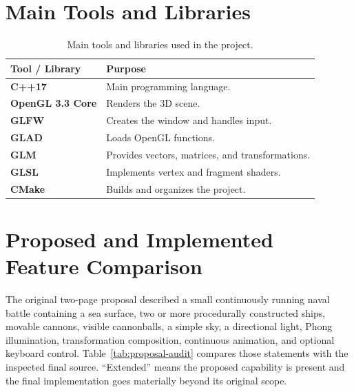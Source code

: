 \documentclass[12pt,a4paper]{report}
\begin{document}
\section{Main Tools and Libraries}
\begin{table}[H]
\centering
\caption{Main tools and libraries used in the project.}
\label{tab:tools}
\begin{tabularx}{0.92\textwidth}{>{\bfseries}p{}Y}
\toprule
Tool / Library & Purpose \\
\midrule
C++17 & Main programming language. \\
OpenGL 3.3 Core & Renders the 3D scene. \\
GLFW & Creates the window and handles input. \\
GLAD & Loads OpenGL functions. \\
GLM & Provides vectors, matrices, and transformations. \\
GLSL & Implements vertex and fragment shaders. \\
CMake & Builds and organizes the project. \\
\bottomrule
\end{tabularx}
\end{table}

\clearpage
\section{Proposed and Implemented Feature Comparison}
The original two-page proposal described a small continuously running naval battle containing a sea surface, two or more procedurally constructed ships, movable cannons, visible cannonballs, a simple sky, a directional light, Phong illumination, transformation composition, continuous animation, and optional keyboard control. Table~\ref{tab:proposal-audit} compares those statements with the inspected final source. ``Extended'' means the proposed capability is present and the final implementation goes materially beyond its original scope.
\end{document}
